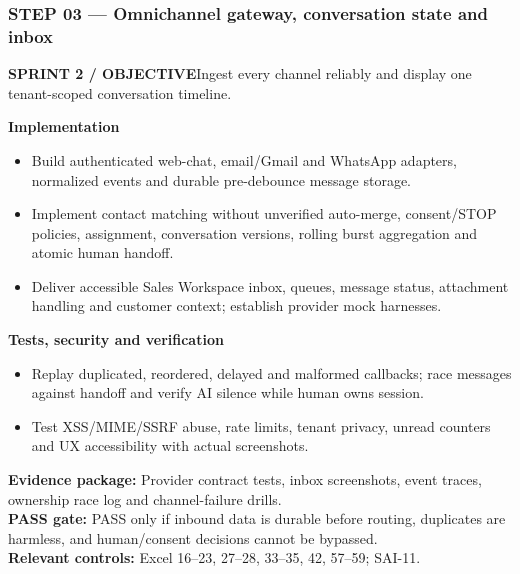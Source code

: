 \documentclass[10.5pt,a4paper,oneside]{article}
\newcommand{\eyebrow}[1]{{\sffamily\footnotesize\bfseries\color{gold}\MakeUppercase{#1}}}
\begin{document}
\subsubsection*{STEP 03 --- Omnichannel gateway, conversation state and inbox}
\eyebrow{Sprint 2 / objective}\quad Ingest every channel reliably and display one tenant-scoped conversation timeline.
\begin{tcolorbox}[colback=warm,colframe=line,boxrule=.45pt,arc=2pt,left=8pt,right=8pt,top=6pt,bottom=6pt]\textbf{Implementation}
\begin{itemize}
\item Build authenticated web-chat, email/Gmail and WhatsApp adapters, normalized events and durable pre-debounce message storage.
\item Implement contact matching without unverified auto-merge, consent/STOP policies, assignment, conversation versions, rolling burst aggregation and atomic human handoff.
\item Deliver accessible Sales Workspace inbox, queues, message status, attachment handling and customer context; establish provider mock harnesses.
\end{itemize}
\textbf{Tests, security and verification}
\begin{itemize}
\item Replay duplicated, reordered, delayed and malformed callbacks; race messages against handoff and verify AI silence while human owns session.
\item Test XSS/MIME/SSRF abuse, rate limits, tenant privacy, unread counters and UX accessibility with actual screenshots.
\end{itemize}
\textbf{Evidence package:} Provider contract tests, inbox screenshots, event traces, ownership race log and channel-failure drills.\\
\textbf{PASS gate:} PASS only if inbound data is durable before routing, duplicates are harmless, and human/consent decisions cannot be bypassed.\\
\textbf{Relevant controls:} Excel 16--23, 27--28, 33--35, 42, 57--59; SAI-11.
\end{tcolorbox}
\Needspace{100mm}
\end{document}
